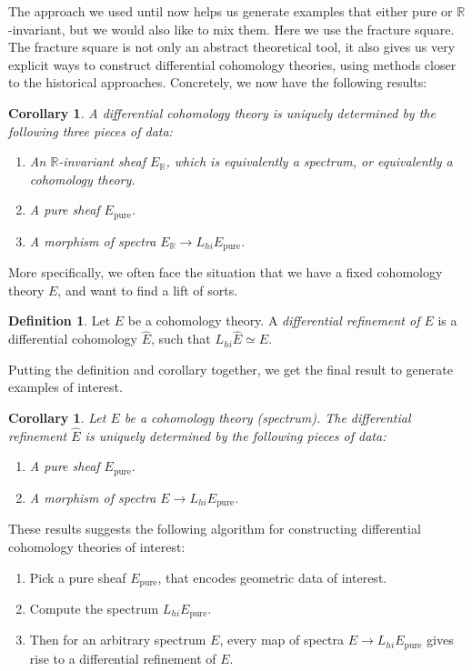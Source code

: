 \documentclass[10pt]{amsart}
\newcommand{\bR}{\mathbb{R}}
\newtheorem{corollary}[equation]{Corollary}
\theoremstyle{definition}
\newtheorem{definition}[equation]{Definition}
\theoremstyle{remark}
\numberwithin{equation}{section}
\begin{document}
The approach we used until now helps us generate examples that either pure or $\bR$-invariant, but we would also like to mix them. Here we use the fracture square. The fracture square is not only an abstract theoretical tool, it also gives us very explicit ways to construct differential cohomology theories, using methods closer to the historical approaches. Concretely, we now have the following results:

\begin{corollary}
  A differential cohomology theory is uniquely determined by the following three pieces of data:
  \begin{enumerate}
    \item An $\bR$-invariant sheaf $E_{\bR}$, which is equivalently a spectrum, or equivalently a cohomology theory.
    \item A pure sheaf $E_{\mathrm{pure}}$. 
    \item A morphism of spectra $E_{\bR} \to L_{hi}E_{\mathrm{pure}}$.
  \end{enumerate}
\end{corollary}

More specifically, we often face the situation that we have a fixed cohomology theory $E$, and want to find a lift of sorts.

\begin{definition}
  Let $E$ be a cohomology theory. A \emph{differential refinement of $E$} is a differential cohomology $\hat{E}$, such that $L_{hi}\hat{E} \simeq E$.
\end{definition}

Putting the definition and corollary together, we get the final result to generate examples of interest.

\begin{corollary}
 Let $E$ be a cohomology theory (spectrum). The differential refinement $\hat{E}$ is uniquely determined by the following pieces of data:
\begin{enumerate}
  \item A pure sheaf $E_{\mathrm{pure}}$.
  \item A morphism of spectra $E \to L_{hi}E_{\mathrm{pure}}$.
\end{enumerate}
\end{corollary}

These results suggests the following algorithm for constructing differential cohomology theories of interest:
\begin{enumerate}
  \item Pick a pure sheaf $E_{\mathrm{pure}}$, that encodes geometric data of interest.
  \item Compute the spectrum $L_{hi}E_{\mathrm{pure}}$.
  \item Then for an arbitrary spectrum $E$, every map of spectra $E \to L_{hi}E_{\mathrm{pure}}$ gives rise to a differential refinement of $E$.
\end{enumerate}
\end{document}

